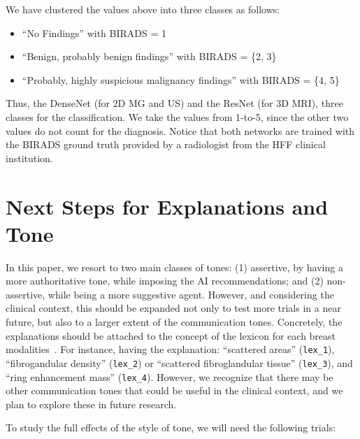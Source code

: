 \vspace{1.15mm}

\noindent
We have clustered the values above into three classes as follows:

\vspace{0.05mm}

\begin{itemize}
\item ``No Findings'' with BIRADS = 1
\item ``Benign, probably benign findings'' with BIRADS = \{2, 3\}
\item ``Probably, highly suspicious malignancy findings'' with BIRADS = \{4, 5\}
\end{itemize}

Thus, the  DenseNet (for 2D MG and US) and the ResNet (for 3D MRI), three classes for the classification.
We take the values from 1-to-5, since the other two values do not count for the diagnosis.
Notice that both networks are trained with the BIRADS ground truth provided by a radiologist from the HFF clinical institution.

\section{Next Steps for Explanations and Tone}
\label{sec:app001007}

In this paper, we resort to two main classes of tones:
(1) assertive, by having a more authoritative tone, while imposing the AI recommendations; and
(2) non-assertive, while being a more suggestive agent.
However, and considering the clinical context, this should be expanded not only to test more trials in a near future, but also to a larger extent of the communication tones.
Concretely, the explanations should be attached to the concept of the lexicon for each breast modalities~\cite{SPAK2017179}.
For instance, having the explanation: ``scattered areas'' (\texttt{lex\_1}), ``fibrogandular density'' (\texttt{lex\_2})  or ``scattered fibroglandular tissue'' (\texttt{lex\_3}), and ``ring enhancement mass'' (\texttt{lex\_4}).
However, we recognize that there may be other communication tones that could be useful in the clinical context, and we plan to explore these in future research.

\vspace{1.5mm}

\noindent
To study the full effects of the style of tone, we will need the following trials:

\vspace{0.05mm}

